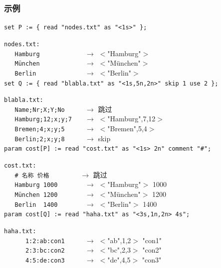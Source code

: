 \subsubsection{示例}
{\small
\verb|set P := { read "nodes.txt" as "<1s>" };|

\smallskip
\noindent\verb|nodes.txt:|\\
\verb|   Hamburg            | $\rightarrow$ $<$"Hamburg"$>$\\
\verb|   München            | $\rightarrow$ $<$"München"$>$\\
\verb|   Berlin             | $\rightarrow$ $<$"Berlin"$>$\\

\smallskip
\noindent\verb|set Q := { read "blabla.txt" as "<1s,5n,2n>" skip 1 use 2 };|

\smallskip
\noindent\verb|blabla.txt:|\\
\verb|   Name;Nr;X;Y;No     | $\rightarrow$ 跳过\\
\verb|   Hamburg;12;x;y;7   | $\rightarrow$ $<$"Hamburg",7,12$>$\\
\verb|   Bremen;4;x;y;5     | $\rightarrow$ $<$"Bremen",5,4$>$\\
\verb|   Berlin;2;x;y;8     | $\rightarrow$ skip\\

\smallskip
\noindent\verb|param cost[P] := read "cost.txt" as "<1s> 2n" comment "#";|

\smallskip
\noindent\verb|cost.txt:|\\
\verb|   # 名称 价格        | $\rightarrow$ 跳过\\
\verb|   Hamburg 1000       | $\rightarrow$ $<$"Hamburg"$>$ 1000\\
\verb|   München 1200       | $\rightarrow$ $<$"München"$>$ 1200\\
\verb|   Berlin  1400       | $\rightarrow$ $<$"Berlin"$>$ 1400\\

\smallskip
\noindent\verb|param cost[Q] := read "haha.txt" as "<3s,1n,2n> 4s";|

\smallskip
\noindent\verb|haha.txt:|\\
\verb|      1:2:ab:con1     | $\rightarrow$ $<$"ab",1,2$>$ "con1"\\
\verb|      2:3:bc:con2     | $\rightarrow$ $<$"bc",2,3$>$ "con2"\\
\verb|      4:5:de:con3     | $\rightarrow$ $<$"de",4,5$>$ "con3"\\
}

